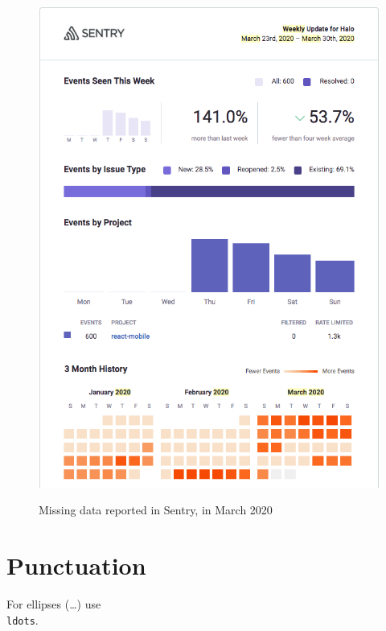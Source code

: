 \begin{figure}[htbp!]
\begin{minipage}{.45\textwidth}
  \includegraphics[width=\textwidth]{images/localhalo/sentry-weekly-report-23-mar-2020.png}
  \label{fig:localhalo-sentry-weekly-report-23-mar-2020}
\end{minipage}
    \caption{Missing data reported in Sentry, in March 2020}
    \label{fig:sentry-missing-data-march-2020}
\end{figure}

\section{Punctuation}

For ellipses (\ldots) use \texttt{\\ldots}.